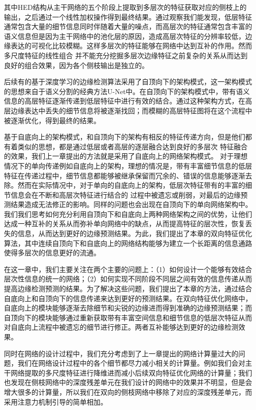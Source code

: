 \documentclass[master]{thesis-uestc}
\begin{document}
{其中HED结构从主干网络的五个阶段上提取到多层次的特征获取对应的侧枝上的输出，之后通过一个线性加权操作得到最终结果。通过观察我们能发现，低层特征通常包含大量的细节信息同时伴随着大量的噪点，而高层次的特征通常包含丰富的语义信息但是因为主干网络中的池化层的原因，造成高层次特征的分辨率较低，边缘表达的可视化比较模糊。这样多层次的特征能够在网络中达到互补的作用。然而多尺度特征的线性组合
并不能充分挖掘多层次边缘特征之前复杂的关系从而达到良好的组合效果，因为各个侧枝输出是独立的。

后续有的基于深度学习的边缘检测算法采用了自顶向下的架构模式，这一架构模式的思想来自于语义分割的经典方法U-Net中。在自顶向下的架构模式中，带有语义信息的高层特征逐渐传递到低层特征中进行有效的结合。通过这种架构方式，在高层边缘表达中丢失的细节信息将被逐渐找回；而模糊的高层特征图将在这个流程中被逐渐优化，得到最终的结果。

基于自底向上的架构模式，和自顶向下的架构有相反的特征传递方向，但是他们都有着类似的思想，都是通过低层或者高层的逐层融合达到良好的多层次 特征融合的效果，我们上一章提出的方法就是采用了自底向上的网络架构模式。 对于理想情况下的单向传递例如自底向上的架构，理想的情况是，带有丰富细节信息的低层特征在传递过程中，细节信息都能够被继承保留而冗余的、错误的信息能够逐渐去除。然而在实际情况中，对于单向的自底向上的架构，低层次特征带有的丰富的细节信息会在不断和高层次特征进行结合的 过程中被遗忘或削弱，对最后的边缘预测结果造成无法修正的影响。同样的问题也会出现在自顶向下的单向网络架构中。我们我们思考如何充分利用自顶向下和自底向上两种网络架构之间的优势，让他们达成一种互补的关系从而弥补单向网络中的缺点，从而提高特征的层次性，恢复丢失的信息，从而达到更好的边缘预测结果。为此，我们提出了本章的双向特征优化算法，其中连续自顶向下和自底向上的网络结构能够为建立一个长距离的信息通路使得多层次的信息更好的流通。

在这一章中，我们主要关注在两个主要的问题上：（1）如何设计一个能够有效结合层次性信息的统一的网络；（2）如何实现不同阶段不同层之间有效的信息传递从而提高边缘检测预测的结果。为了解决这些问题，我们提出了本章的方法，通过结合自底向上和自顶向下的信息传递来达到更好的预测结果。在双向特征优化网络中，自底向上的模块能够逐渐去除细节和尖锐的边缘进而得到准确的边缘预测结果；而自顶向下的模块能够通过重新获取带有丰富空间信息和细节信息的低层次特征从而对自底向上流程中被遗忘的细节进行修正。两者互补能够达到更好的边缘检测效果。
 
同时在网络的设计过程中，我们充分考虑到了上一章提出的网络计算量过大的问题，我们在网络设计过程中的各个细节都尽力减小相关的计算量。例如我们会对主干网络提取的多尺度特征进行降维进而减小后续双向特征优化网络的计算量；我们也发现在侧枝网络中的深度残差单元在我们设计的网络中的效果并不明显，但是会增大很多的计算量，所以我们在双向的侧枝网络中移除了对应的深度残差单元，而采用注意力机制引导的简单相加。

}
\end{document}

